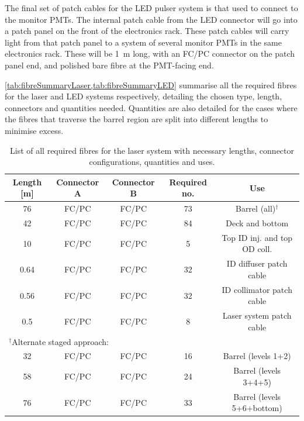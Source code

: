 \documentclass[a4paper,11pt]{article}
\begin{document}
The final set of patch cables for the LED pulser system is that used to connect to the monitor PMTs. The internal patch cable from the LED connector will go into a patch panel on the front of the electronics rack. These patch cables will carry light from that patch panel to a system of several monitor PMTs in the same electronics rack. These will be 1~m long, with an FC/PC connector on the patch panel end, and polished bare fibre at the PMT-facing end.

\cref{tab:fibreSummaryLaser,tab:fibreSummaryLED} summarise all the required fibres for the laser and LED systems respectively, detailing the chosen type, length, connectors and quantities needed. Quantities are also detailed for the cases where the fibres that traverse the barrel region are split into different lengths to minimise excess.

\begin{table}[h]
\centering
\setlength{\tabcolsep}{4pt}
\begin{tabular}{ccccc}
\toprule
Length [m]	&	Connector A	&	Connector B	&	Required no.	&	Use		\\ \midrule
76			&	FC/PC		&	FC/PC		&	73				&	Barrel (all)$^\dagger$	\\
42			&	FC/PC		&	FC/PC		&	84				&	Deck and bottom	\\
10			&	FC/PC		&	FC/PC		&	5				&	Top ID inj. and top OD coll. \\
0.64		&	FC/PC		&	FC/PC		&	32				&	ID diffuser patch cable	\\
0.56		&	FC/PC		&	FC/PC		&	32				&	ID collimator patch cable	\\
0.5			&	FC/PC		&	FC/PC		&	8				&	Laser system patch cable \\ \midrule
\multicolumn{3}{l}{$^\dagger$Alternate staged approach:}			&					&			\\
32			&	FC/PC		&	FC/PC		&	16				&	Barrel (levels 1+2) \\
58			&	FC/PC		&	FC/PC		&	24				&	Barrel (levels 3+4+5)	\\
76			&	FC/PC		&	FC/PC		&	33				&	Barrel (levels 5+6+bottom)	\\
\bottomrule
\end{tabular}
\caption{List of all required fibres for the laser system with necessary lengths, connector configurations, quantities and uses.}\label{tab:fibreSummaryLaser}
\end{table}
\end{document}
